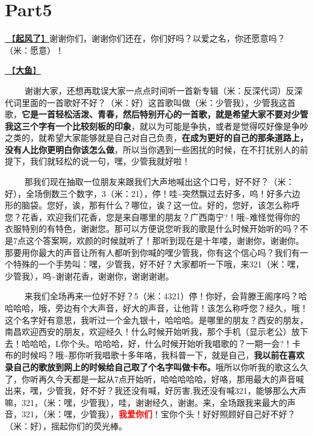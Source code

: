 \documentclass[]{ctexbook}
\begin{document}
\section{Part5}\label{nanchang-20241123-part5}

\hyperref[the-wind-rises]{🎵【\textbf{起风了}】}谢谢你们，谢谢你们还在，你们好吗？以爱之名，你还愿意吗？（米：愿意）！

\hyperref[big-fish]{🎵【\textbf{大鱼}】}

   谢谢大家，还想再耽误大家一点点时间听一首新专辑（米：反深代词）反深代词里面的一首歌好不好？（米：好）这首歌叫做（米：少管我），少管我这首歌，\textbf{它是一首轻松活泼、青春，然后特别开心的一首歌，就是希望大家不要对少管我这三个字有一个比较刻板的印象}，就以为可能是争执，或者是觉得哎好像是争吵之类的，就希望大家能够就是自己对自己负责，\textbf{在成为更好的自己的那条道路上，没有人比你更明白你该怎么做}，所以当你遇到一些困扰的时候，在不打扰别人的前提下，我们就轻松的说一句，嘿，少管我就好啦！

   那我们现在抽取一位朋友来跟我们大声地喊出这个口号，好不好？（米：好），全场倒数三个数字，3（米：21），停！哇\textasciitilde 突然飘过去好多，呜！好多六边形的脑袋。您好，诶，那有什么？哪位，诶？这一位。好的，您好，该怎么称呼您？花香，欢迎我们花香，您是来自哪里的朋友？广西南宁?！哦\textasciitilde 难怪觉得你的衣服特别的有特色，谢谢您。那可以方便说您听我的歌是什么时候开始听的吗？不是7点这个答案啊，欢颜的时候就听了！那听到现在是十年喽，谢谢你，谢谢你。那要用你最大的声音让所有人都听到你喊的嘿少管我，你有这个信心吗？我们有一个特殊的一个手势叫：嘿，少管我，好不好？大家都听一下哦，来321（米：嘿，少管我），呜\textasciitilde 谢谢花香，谢谢你，谢谢谢谢。

   来我们全场再来一位好不好？5（米：4321）停！你好，会背滕王阁序吗？哈哈哈哈，哦，旁边有个大声音，好大的声音，让他背！该怎么称呼您？经久，哦！这个名字好有意思，我听过一个金九银十，哈哈哈。是哪里的朋友？西安的朋友，南昌欢迎西安的朋友，欢迎经久！什么时候开始听我，那个手机（显示老公）放下去！哈哈哈，L你个头。哈哈哈，好，什么时候开始听我唱歌的？一期一会?！卡布的时候吗？哦\textasciitilde 那你听我唱歌十多年咯，我科普一下，就是自己，\textbf{我以前在喜欢录自己的歌放到网上的时候给自己取了个名字叫做卡布。}哦所以你听我的歌这么久了，你听再久今天都是一起从7点开始听，哈哈哈哈哈，好咯，那用最大的声音喊出来，嘿，少管我，好不好？我还没有喊，好厉害,我还没有喊321，能够那么大声嘛，321，（米：嘿，少管我），哇，谢谢经久，谢谢。来，全场跟我来最大的声音，321，（米：嘿，少管我），\textbf{\textcolor{red}{我爱你们}}！宝你个头！好好照顾好自己好不好？（米：好），摇起你们的荧光棒。
\end{document}
